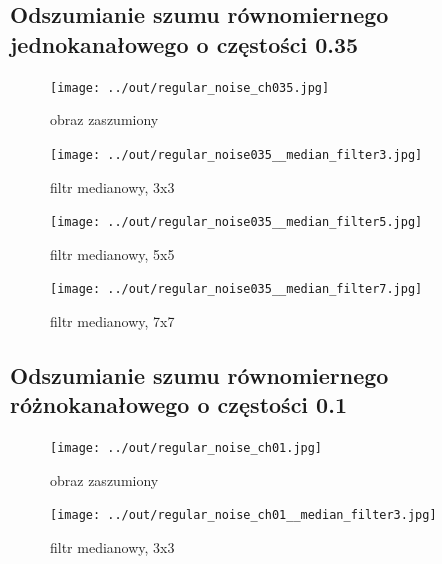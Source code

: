 \documentclass[a4paper,12pt]{article}
\begin{document}
\newpage
\subsection{Odszumianie szumu równomiernego jednokanałowego o częstości 0.35}
\begin{figure}[h!]
\begin{minipage}[t]{7.5cm}
\begin{center}
\texttt{[image: ../out/regular\_noise\_ch035.jpg]}
\caption{obraz zaszumiony}
\end{center}
\end{minipage}
\hfill
\begin{minipage}[t]{7.5cm}
\begin{center}
\texttt{[image: ../out/regular\_noise035\_\_median\_filter3.jpg]}
\caption{filtr medianowy, 3x3}
\end{center}
\end{minipage}
\end{figure}

\begin{figure}[h!]
\begin{minipage}[t]{7.5cm}
\begin{center}
\texttt{[image: ../out/regular\_noise035\_\_median\_filter5.jpg]}
\caption{filtr medianowy, 5x5}
\end{center}
\end{minipage}
\hfill
\begin{minipage}[t]{7.5cm}
\begin{center}
\texttt{[image: ../out/regular\_noise035\_\_median\_filter7.jpg]}
\caption{filtr medianowy, 7x7}
\end{center}
\end{minipage}
\end{figure}


\newpage
\subsection{Odszumianie szumu równomiernego różnokanałowego o częstości 0.1}
\begin{figure}[h!]
\begin{minipage}[t]{7.5cm}
\begin{center}
\texttt{[image: ../out/regular\_noise\_ch01.jpg]}
\caption{obraz zaszumiony}
\end{center}
\end{minipage}
\hfill
\begin{minipage}[t]{7.5cm}
\begin{center}
\texttt{[image: ../out/regular\_noise\_ch01\_\_median\_filter3.jpg]}
\caption{filtr medianowy, 3x3}
\end{center}
\end{minipage}
\end{figure}
\end{document}
